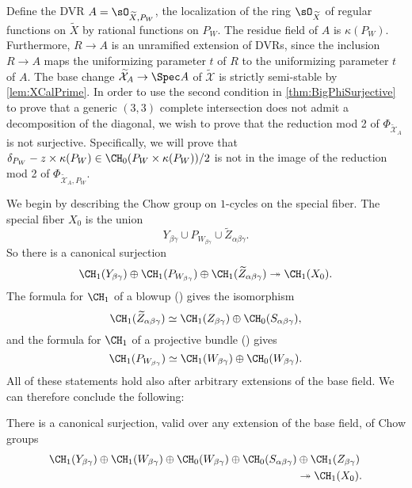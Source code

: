 Define the DVR $A = \sO_{\widetilde{X},P_W}$, the localization of the ring $\sO_{\widetilde{X}}$ of regular functions on $\widetilde{X}$ by rational functions on $P_W$. The residue field of $A$ is $\kappa(P_W)$. Furthermore, $R \to A$ is an unramified extension of DVRs, since the inclusion $R \to A$ maps the uniformizing parameter $t$ of $R$ to the uniformizing parameter $t$ of $A$. The base change $\widetilde{\mathcal{X}}_A \to \Spec A$ of $\widetilde{\mathcal{X}}$ is strictly semi-stable by \cref{lem:XCalPrime}. In order to use the second condition in \cref{thm:BigPhiSurjective} to prove that a generic $(3,3)$ complete intersection does not admit a decomposition of the diagonal, we wish to prove that the reduction mod 2 of $\Phi_{\widetilde{\mathcal{X}}_A}$ is not surjective. Specifically, we will prove that $\delta_{P_W} - z \times \kappa(P_W) \in \CH_0(P_W \times \kappa(P_W))/2$ is not in the image of the reduction mod 2 of $\Phi_{\widetilde{\mathcal{X}}_A,P_W}$.

We begin by describing the Chow group on $1$-cycles on the special fiber.
The special fiber $X_0$ is the union
\[Y_{\beta\gamma} \cup P_{W_{\beta\gamma}} \cup \widetilde{Z}_{\alpha \beta\gamma}.\]
So there is a canonical surjection 
\[\CH_1(Y_{\beta \gamma}) \oplus \CH_1(P_{W_{\beta\gamma}}) \oplus \CH_1(\widetilde{Z}_{\alpha \beta\gamma})  \twoheadrightarrow \CH_1(X_0).\]
The formula for $\CH_1$ of a blowup (\cite[Proposition 6.7]{FultonIntersectionTheory}) gives the isomorphism 
\[\CH_1(\widetilde{Z}_{\alpha \beta\gamma}) \simeq \CH_1(Z_{\beta \gamma}) \oplus \CH_0(S_{\alpha \beta \gamma}),\]
and the formula for $\CH_1$ of a projective bundle (\cite[Theorem 3.3]{FultonIntersectionTheory}) gives
\[\CH_1(P_{W_{\beta\gamma}}) \simeq \CH_1(W_{\beta \gamma}) \oplus \CH_0(W_{\beta \gamma}).\]
All of these statements hold also after arbitrary extensions of the base field. We can therefore conclude the following:
\begin{lemma}
  \label{lem:CanonicalSurjection}
  There is a canonical surjection, valid over any extension of the base field, of Chow groups
  \begin{align}
    \label{eq:CanonicalSurjection}
    \CH_1(Y_{\beta \gamma}) \oplus\CH_1(W_{\beta \gamma}) \oplus \CH_0(W_{\beta \gamma}) \oplus  \CH_0(S_{\alpha \beta \gamma}) &\oplus  \CH_1(Z_{\beta \gamma}) \nonumber \\
    											&\twoheadrightarrow \CH_1(X_0).
  \end{align}
\end{lemma}

